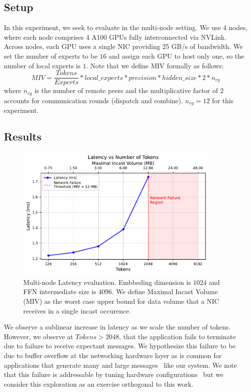 \subsection{Setup}\label{subsec:setup}
In this experiment, we seek to evaluate \sysname in the multi-node setting.
We use 4 nodes, where each node comprises 4 A100 GPUs fully interconnected via NVLink.
Across nodes, each GPU uses a single NIC providing 25 GB/s of bandwidth.
We set the number of experts to be $16$ and assign each GPU to host only one,
so the number of local experts is $1$.
Note that we define MIV formally as follows:
\[
    MIV = \frac{Tokens}{Experts} * local\_{experts} * precision * hidden\_size * 2 * n_{rg}
\]
where $n_{rg}$ is the number of remote peers and the multiplicative
factor of $2$ accounts for communication rounds (dispatch and combine).
$n_{rg} = 12$ for this experiment.
\subsection{Results}\label{subsec:results}
\begin{figure} [!ht]
    \centering
    \includegraphics[width=4in,keepaspectratio]{figures/multi_node_fail}
    \caption{Multi-node Latency evaluation.
    Embbeding dimension is $1024$ and FFN intermediate size is $4096$.
    We define Maximal Incast Volume (MIV) as the worst case upper bound for data volume that a
    NIC receives in a single incast occurence.}
    \label{fig:multi_fail}
\end{figure}
We observe a sublinear increase in latency as we scale the number of tokens.
However, we observe at $Tokens > 2048$, that the application fails to terminate
due to failure to receive expectant messages.
We hypothesize this failure to be due to buffer overflow at the networking hardware layer as is common for applications
that generate many and large messages~\cite{nerscNetworkNERSC} like our system.
We note that this failure is addressable by tuning hardware configurations~\cite{ofiwgFi_cxi7} but we consider
this exploration as an exercise orthogonal to this work.
\clearpage